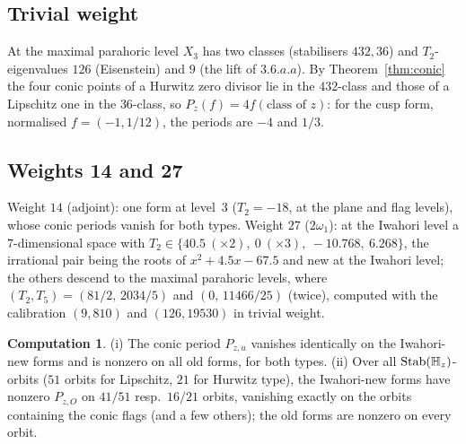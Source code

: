 \documentclass[11pt]{amsart}
\theoremstyle{definition}
\newtheorem{computation}[theorem]{Computation}
\newcommand{\Stab}{\operatorname{Stab}}\newcommand{\Aut}{\operatorname{Aut}}\newcommand{\Der}{\operatorname{Der}}\renewcommand{\Im}{\operatorname{Im}}
\begin{document}
\subsection{Trivial weight}
At the maximal parahoric level $X_3$ has two classes (stabilisers $432,36$) and $T_2$-eigenvalues $126$ (Eisenstein) and $9$ (the lift of $3.6.a.a$). By Theorem~\ref{thm:conic} the four conic points of a Hurwitz zero divisor lie in the $432$-class and those of a Lipschitz one in the $36$-class, so $P_z(f)=4f(\text{class of }z)$: for the cusp form, normalised $f=(-1,1/12)$, the periods are $-4$ and $1/3$.

\subsection{Weights 14 and 27}
Weight $14$ (adjoint): one form at level~$3$ ($T_2=-18$, at the plane and flag levels), whose conic periods vanish for both types. Weight $27$ ($2\omega_1$): at the Iwahori level a $7$-dimensional space with $T_2\in\{40.5\ (\times 2),\ 0\ (\times 3),\ -10.768,\ 6.268\}$, the irrational pair being the roots of $x^2+4.5x-67.5$ and new at the Iwahori level; the others descend to the maximal parahoric levels, where $(T_2,T_5)=(81/2,\,2034/5)$ and $(0,\,11466/25)$ (twice), computed with the calibration $(9,810)$ and $(126,19530)$ in trivial weight.

\begin{computation}\label{comp:periods}
(i) The conic period $P_{z,u}$ vanishes identically on the Iwahori-new forms and is nonzero on all old forms, for both types. (ii) Over all $\Stab(\Hq_z)$-orbits ($51$ orbits for Lipschitz, $21$ for Hurwitz type), the Iwahori-new forms have nonzero $P_{z,O}$ on $41/51$ resp.\ $16/21$ orbits, vanishing exactly on the orbits containing the conic flags (and a few others); the old forms are nonzero on every orbit.
\end{computation}
\end{document}
